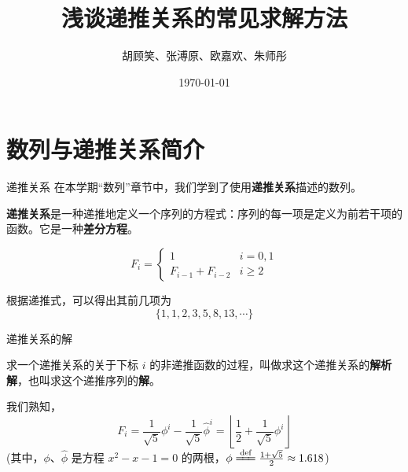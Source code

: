 \documentclass{beamer}
\newcommand{\DocumentTitle}{浅谈递推关系的常见求解方法}
\newcommand{\DocumentAuthor}{胡顾笑、张溥原、欧嘉欢、朱师彤}
\begin{document}
\title{\textbf\DocumentTitle}
\author[国际课程班高一下数学小组展示]{\DocumentAuthor}
\date{\mydate\today}

\maketitle

\section{数列与递推关系简介}

\begin{frame}{递推关系}
    在本学期“数列”章节中，我们学到了使用\textbf{递推关系}描述的数列。
    \begin{definition}
        \textbf{递推关系}是一种递推地定义一个序列的方程式：序列的每一项是定义为前若干项的函数。它是一种\textbf{差分方程}。
    \end{definition}
    \begin{example}
        \begin{displaymath}
            F_i = \begin{cases} 
                1 & i=0,1\\
                F_{i-1} + F_{i-2} & i\geqslant 2
              \end{cases}
        \end{displaymath}

        根据递推式，可以得出其前几项为
        $$
        \{1,1,2,3,5,8,13,\cdots\}
        $$
    \end{example}
\end{frame}

\begin{frame}{递推关系的解}
    \begin{definition}
        求一个递推关系的关于下标 $i$ 的非递推函数的过程，叫做求这个递推关系的\textbf{解析解}，也叫求这个递推序列的\textbf{解}。
    \end{definition}
    \begin{example}
        我们熟知，
        $$
            F_i = \frac{1}{\sqrt 5} \phi^i - \frac{1}{\sqrt 5} {\hat\phi}^i = \left\lfloor\frac12+\frac{1}{\sqrt 5}\phi^i\right\rfloor
        $$
        (其中，$\phi$、$\hat\phi$ 是方程 $x^2 - x - 1 = 0$ 的两根，$\phi \xlongequal{\text{def}} \frac{1 + \sqrt 5}{2}\approx 1.618$)
    \end{example}
\end{frame}
\end{document}
